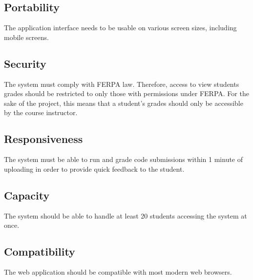 \documentclass{article}
\begin{document}

\subsection{Portability}
The application interface needs to be usable on various screen sizes, including mobile screens.

\subsection{Security}

The system must comply with FERPA law. Therefore, access to view students grades should be restricted to only those with permissions under FERPA. For the sake of the project, this means that a student's grades should only be accessible by the course instructor.

\subsection{Responsiveness}

The system must be able to run and grade code submissions within 1 minute of uploading in order to provide quick feedback to the student.

\subsection{Capacity}

The system should be able to handle at least 20 students accessing the system at once.

\subsection{Compatibility}

The web application should be compatible with most modern web browsers.
\end{document}
